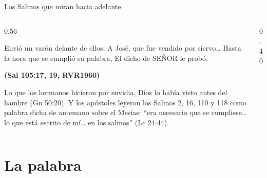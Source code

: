 \documentclass[hyperref={bookmarks=false},aspectratio=169]{beamer}
\newcommand{\SENOR}{S{\fontsize{0.78em}{1em}\selectfont EÑOR}}
\newcommand{\fuente}[1]{\par\hfill{\upshape\bfseries\footnotesize\textcolor{azul}{#1}}}
\begin{document}
\begin{frame}{Los Salmos que miran hacia adelante}
\begin{columns}[c,onlytextwidth]
\begin{column}{0.56\textwidth}
\begin{cita}Envió un varón delante de ellos; A José, que fue vendido por siervo\ldots{} Hasta la hora que se cumplió su palabra, El dicho de \SENOR{} le probó.\fuente{(Sal 105:17, 19, RVR1960)}\end{cita}
\small Lo que los hermanos hicieron por envidia, Dios lo había visto antes del hambre (Gn 50:20). Y los apóstoles leyeron los Salmos 2, 16, 110 y 118 como palabra dicha de antemano sobre el Mesías: ``era necesario que se cumpliese\ldots{} lo que está escrito de mí\ldots{} en los salmos'' (Lc 24:44).
\end{column}
\begin{column}{0.40\textwidth}
\centering
{}
\end{column}
\end{columns}
\end{frame}

\section{La palabra}
\end{document}
